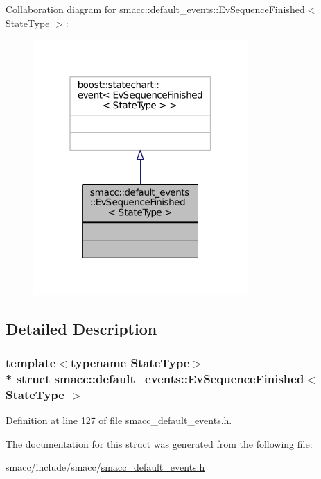 Collaboration diagram for smacc\+:\+:default\+\_\+events\+:\+:Ev\+Sequence\+Finished$<$ State\+Type $>$\+:
\nopagebreak
\begin{figure}[H]
\begin{center}
\leavevmode
\includegraphics[width=232pt]{structsmacc_1_1default__events_1_1EvSequenceFinished__coll__graph}
\end{center}
\end{figure}


\subsection{Detailed Description}
\subsubsection*{template$<$typename State\+Type$>$\\*
struct smacc\+::default\+\_\+events\+::\+Ev\+Sequence\+Finished$<$ State\+Type $>$}



Definition at line 127 of file smacc\+\_\+default\+\_\+events.\+h.



The documentation for this struct was generated from the following file\+:\begin{DoxyCompactItemize}
\item 
smacc/include/smacc/\hyperlink{smacc__default__events_8h}{smacc\+\_\+default\+\_\+events.\+h}\end{DoxyCompactItemize}
